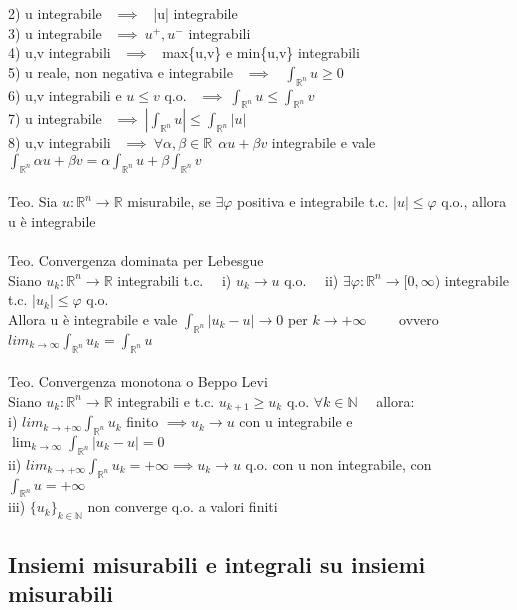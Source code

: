 \documentclass{article}
\theoremstyle{unnumbered}
\theoremstyle{unnumbered1}
\begin{document}
2) u integrabile \  $\implies$ \ |u| integrabile\\
3) u integrabile \ $\implies \ u^+, u^-$ integrabili\\
4) u,v integrabili \ $\implies$ \ max\{u,v\} e min\{u,v\} integrabili\\
5) u reale, non negativa e integrabile \ $\implies$ \ $\int_{\mathbb{R}^n}u\ge0$\\
6) u,v integrabili e  $u\le v$ q.o. \ $\implies \ \int_{\mathbb{R}^n}u \le \int_{\mathbb{R}^n}v$\\
7) u integrabile \ $\implies \ |\int_{\mathbb{R}^n}u|\le \int_{\mathbb{R}^n}|u|$\\
8) u,v integrabili \ $\implies \ \forall \alpha, \beta \in \mathbb{R} \ \ \alpha u +\beta v$ integrabile e vale $\int_{\mathbb{R}^n}\alpha u+\beta v = \alpha \int_{\mathbb{R}^n}u + \beta\int_{\mathbb{R}^n}v$\\ \\
%
%
Teo. Sia $u:\mathbb{R}^n\rightarrow\mathbb{R}$ misurabile, se $\exists\varphi$ positiva e integrabile t.c. $|u|\le\varphi$ q.o., allora u è integrabile\\ \\
%
%
Teo. Convergenza dominata per Lebesgue\\
Siano $u_k:\mathbb{R}^n\rightarrow\mathbb{R}$ integrabili t.c. \ \ i) $u_k\rightarrow u$ q.o. \ \ ii) $\exists\varphi:\mathbb{R}^n\rightarrow[0,\infty)$ integrabile t.c. $|u_k|\le\varphi$ q.o. \\ Allora u è integrabile e vale $\int_{\mathbb{R}^n}|u_k -u|\rightarrow 0$ per $k\to +\infty$ \ \ \ \ ovvero $lim_{k\to\infty}\int_{\mathbb{R}^n}u_k=\int_{\mathbb{R}^n}u$\\ \\
%
%
Teo. Convergenza monotona o Beppo Levi\\
Siano $u_k:\mathbb{R}^n\to\mathbb{R}$ integrabili e t.c. $u_{k+1}\ge u_k$ q.o. $\forall k \in \mathbb{N}$ \ \ allora: \\
i) $lim_{k\to+\infty}\int_{\mathbb{R}^n}u_k$ finito $\implies u_k\to u$ con u integrabile e $\lim_{k\to\infty}\int_{\mathbb{R}^n}|u_k-u|=0$\\
ii) $lim_{k\to+\infty}\int_{\mathbb{R}^n}u_k= +\infty \implies u_k\to u$ q.o. con u non integrabile, con $\int_{\mathbb{R}^n}u=+\infty$\\
iii) $\{u_k\}_{k\in\mathbb{N}}$ non converge q.o. a valori finiti\\


\subsection{Insiemi misurabili e integrali su insiemi misurabili}
\end{document}
